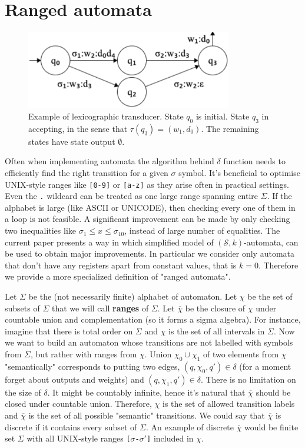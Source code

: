 \section{Ranged automata}


\begin{figure}[!t]
	\centering
	\includegraphics[width=9cm]{transducer} 
	\caption{Example of lexicographic transducer. State $q_0$ is initial. State $q_3$ in accepting, in the sense that $\tau(q_3)=(w_1,d_0)$. The remaining states have state output $\emptyset$.}
	\label{transducer}
\end{figure}

Often when implementing automata the algorithm behind $\delta$ function needs to efficiently find the right transition for a given $\sigma$ symbol. It's beneficial to optimise UNIX-style ranges like \texttt{[0-9]} or \texttt{[a-z]} as they arise often in practical settings. Even the \texttt{.} wildcard can be treated as one large range spanning entire $\Sigma$. If the alphabet is large (like ASCII or UNICODE), then checking every one of them in a loop is not feasible. A significant improvement can be made by only checking two inequalities like $\sigma_1\le x \le \sigma_{10}$, instead of large number of equalities. The current paper presents a way in which simplified model of $(\mathcal{S},k)$-automata\cite{MEER}\cite{Gandhi}, can be used to obtain major improvements. In particular we consider only automata that don't have any registers apart from constant values, that is $k=0$. Therefore we provide a more specialized definition of "ranged automata". 

Let $\Sigma$ be the (not necessarily finite) alphabet of automaton. Let $\chi$ be the set of subsets of $\Sigma$ that we will call \textbf{ranges} of $\Sigma$. Let  $\overline{\chi}$ be  the closure of $\chi$ under countable union and complementation (so it forms a sigma algebra). For instance, imagine that there is total order on $\Sigma$ and  $\chi$ is the set of all intervals in $\Sigma$. Now we want to build an automaton whose transitions are not labelled with symbols from $\Sigma$, but rather with ranges from $\chi$. Union $\chi_0\cup\chi_1$ of two elements from $\chi$ "semantically" corresponds to putting two edges, $(q,\chi_0,q')\in\delta$ (for a moment forget about outputs and weights) and $(q,\chi_1,q')\in\delta$. There is no limitation on the size of $\delta$. It might be countably infinite, hence it's natural that $\overline{\chi}$ should be closed under countable union. Therefore, $\chi$ is the set of allowed transition labels and $\overline{\chi}$ is the set of all possible "semantic" transitions. We could say that $\overline{\chi}$ is discrete if it contains every subset of $\Sigma$. An example of discrete $\overline{\chi}$ would be finite set $\Sigma$ with all UNIX-style ranges \texttt{[$\sigma$-$\sigma'$]} included in $\chi$. 

